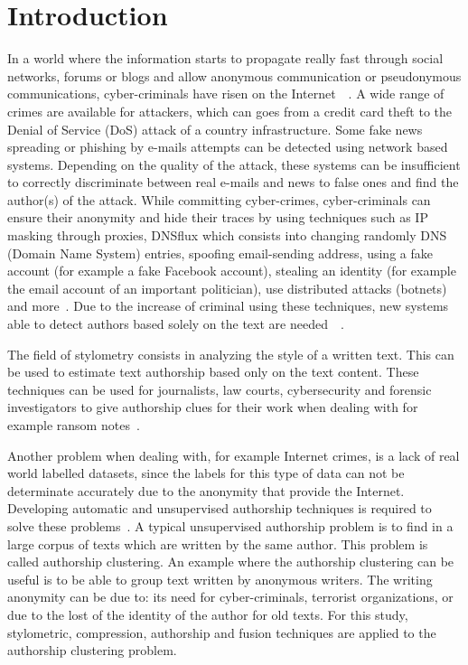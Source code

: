 
\section{Introduction \label{sec:introduction}}

In a world where the information starts to propagate really fast through social networks, forums or blogs and allow anonymous communication or pseudonymous communications, cyber-criminals have risen on the Internet~\cite{automated_unsupervised}~\cite{kocher_pan16}.
A wide range of crimes are available for attackers, which can goes from a credit card theft to the Denial of Service (DoS) attack of a country infrastructure.
Some fake news spreading or phishing by e-mails attempts can be detected using network based systems.
Depending on the quality of the attack, these systems can be insufficient to correctly discriminate between real e-mails and news to false ones and find the author(s) of the attack.
While committing cyber-crimes, cyber-criminals can ensure their anonymity and hide their traces by using techniques such as IP masking through proxies, DNSflux which consists into changing randomly DNS (Domain Name System) entries, spoofing email-sending address, using a fake account (for example a fake Facebook account), stealing an identity (for example the email account of an important politician), use distributed attacks (botnets) and more~\cite{attribution_in_cyberspace}.
Due to the increase of criminal using these techniques, new systems able to detect authors based solely on the text are needed~\cite{automated_unsupervised}~\cite{unine_pan20_fake_news}.

The field of stylometry consists in analyzing the style of a written text.
This can be used to estimate text authorship based only on the text content.
These techniques can be used for journalists, law courts, cybersecurity and forensic investigators to give authorship clues for their work when dealing with for example ransom notes~\cite{pan16_clustering_site}.

Another problem when dealing with, for example Internet crimes, is a lack of real world labelled datasets, since the labels for this type of data can not be determinate accurately due to the anonymity that provide the Internet.
Developing automatic and unsupervised authorship techniques is required to solve these problems~\cite{automated_unsupervised}.
A typical unsupervised authorship problem is to find in a large corpus of texts which are written by the same author.
This problem is called authorship clustering.
An example where the authorship clustering can be useful is to be able to group text written by anonymous writers.
The writing anonymity can be due to: its need for cyber-criminals, terrorist organizations, or due to the lost of the identity of the author for old texts.
For this study, stylometric, compression, authorship and fusion techniques are applied to the authorship clustering problem.

